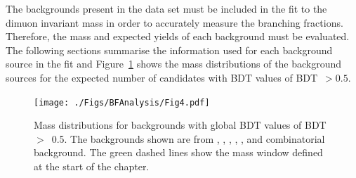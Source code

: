 The backgrounds present in the data set must be included in the fit to the dimuon invariant mass in order to accurately measure the \bmumu branching fractions.
Therefore, the mass \pdfs and expected yields of each background must be evaluated. The following sections summarise the information used for each background source in the \BF fit and Figure~\ref{fig:BFbkgnds} shows the mass distributions of the background sources for the expected number of candidates with BDT values of BDT~$> 0.5$.

\begin{figure}[tbp]
    \centering
     \texttt{[image: ./Figs/BFAnalysis/Fig4.pdf]}
     \caption{Mass distributions for \bmumu backgrounds with global BDT values of BDT~$>$~0.5. The backgrounds shown are from \bhh, \bdpimunu, \bsKmunu, \lambdab, \bpimumu, \bcjpsimunu and combinatorial background. The green dashed lines show the \bmumu mass window defined at the start of the chapter. }
     \label{fig:BFbkgnds}
\end{figure}

